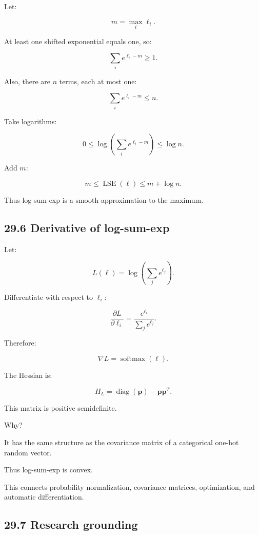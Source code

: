 \hypertarget{02-foundations-ii-ch031-log-sum-exp-bounds}{}

Let:

\[ m=\max_i\ell_i. \]

At least one shifted exponential equals one, so:

\[ \sum_ie^{\ell_i-m}\ge1. \]

Also, there are \(n\) terms, each at most one:

\[ \sum_ie^{\ell_i-m}\le n. \]

Take logarithms:

\[ 0\le \log\left(\sum_ie^{\ell_i-m}\right) \le\log n. \]

Add \(m\):

\[ \boxed{ m\le\operatorname{LSE}(\ell)\le m+\log n }. \]

Thus log-sum-exp is a smooth approximation to the maximum.

\subsection{29.6 Derivative of log-sum-exp}\label{02-foundations-ii-ch031-derivative-of-log-sum-exp}

\hypertarget{02-foundations-ii-ch031-derivative-of-log-sum-exp}{}

Let:

\[ L(\ell)=\log\left(\sum_je^{\ell_j}\right). \]

Differentiate with respect to \(\ell_i\):

\[ \frac{\partial L}{\partial\ell_i} = \frac{e^{\ell_i}}{\sum_je^{\ell_j}}. \]

Therefore:

\[ \boxed{ \nabla L=\operatorname{softmax}(\ell) }. \]

The Hessian is:

\[ \boxed{ H_L= \operatorname{diag}(\mathbf p)-\mathbf p\mathbf p^T }. \]

This matrix is positive semidefinite.

Why?

It has the same structure as the covariance matrix of a categorical one-hot random vector.

Thus log-sum-exp is convex.

This connects probability normalization, covariance matrices, optimization, and automatic differentiation.

\subsection{29.7 Research grounding}\label{02-foundations-ii-ch031-research-grounding}

